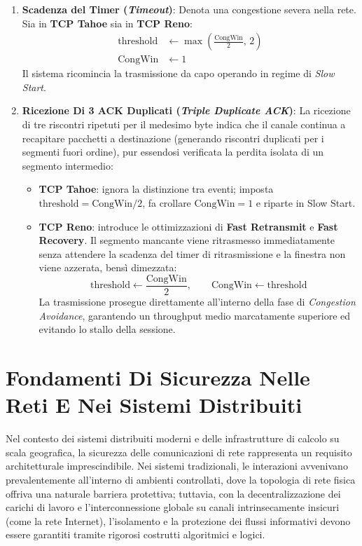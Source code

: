 \documentclass[11pt, a4paper]{article}
\begin{document}
\begin{enumerate}
    \item \textbf{Scadenza del Timer (\emph{Timeout})}:
    Denota una congestione severa nella rete. Sia in \textbf{TCP Tahoe} sia in \textbf{TCP Reno}:
    \begin{align*}
        \text{threshold} &\gets \max\left(\frac{\text{CongWin}}{2}, \, 2\right) \\
        \text{CongWin} &\gets 1
    \end{align*}
    Il sistema ricomincia la trasmissione da capo operando in regime di \emph{Slow Start}.

    \item \textbf{Ricezione Di 3 ACK Duplicati (\emph{Triple Duplicate ACK})}:
    La ricezione di tre riscontri ripetuti per il medesimo byte indica che il canale continua a recapitare pacchetti a destinazione (generando riscontri duplicati per i segmenti fuori ordine), pur essendosi verificata la perdita isolata di un segmento intermedio:
    \begin{itemize}
        \item \textbf{TCP Tahoe}: ignora la distinzione tra eventi; imposta $\text{threshold} = \text{CongWin}/2$, fa crollare $\text{CongWin} = 1$ e riparte in Slow Start.
        \item \textbf{TCP Reno}: introduce le ottimizzazioni di \textbf{Fast Retransmit} e \textbf{Fast Recovery}. Il segmento mancante viene ritrasmesso immediatamente senza attendere la scadenza del timer di ritrasmissione e la finestra non viene azzerata, bensì dimezzata:
        \[
            \boxed{\text{threshold} \gets \frac{\text{CongWin}}{2}, \qquad \text{CongWin} \gets \text{threshold}}
        \]
        La trasmissione prosegue direttamente all'interno della fase di \emph{Congestion Avoidance}, garantendo un throughput medio marcatamente superiore ed evitando lo stallo della sessione.
    \end{itemize}
\end{enumerate}


\section{Fondamenti Di Sicurezza Nelle Reti E Nei Sistemi Distribuiti}

Nel contesto dei sistemi distribuiti moderni e delle infrastrutture di calcolo su scala geografica, la sicurezza delle comunicazioni di rete rappresenta un requisito architetturale imprescindibile. Nei sistemi tradizionali, le interazioni avvenivano prevalentemente all'interno di ambienti controllati, dove la topologia di rete fisica offriva una naturale barriera protettiva; tuttavia, con la decentralizzazione dei carichi di lavoro e l'interconnessione globale su canali intrinsecamente insicuri (come la rete Internet), l'isolamento e la protezione dei flussi informativi devono essere garantiti tramite rigorosi costrutti algoritmici e logici.
\end{document}
